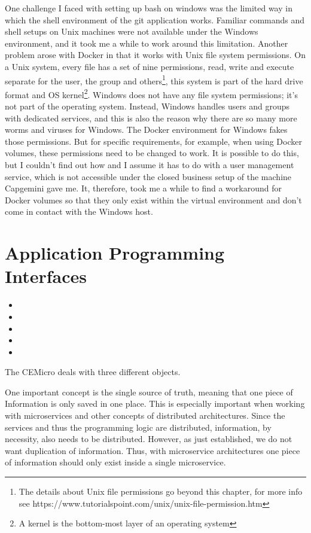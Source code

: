One challenge I faced with setting up bash on windows was the limited way in which the shell environment of the git application works. Familiar commands and shell setups on Unix machines were not available under the Windows environment, and it took me a while to work around this limitation. Another problem arose with Docker in that it works with Unix file system permissions. On a Unix system, every file has a set of nine permissions, read, write and execute separate for the user, the group and others\footnote{The details about Unix file permissions go beyond this chapter, for more info see https://www.tutorialspoint.com/unix/unix-file-permission.htm}, this system is part of the hard drive format and OS kernel\footnote{A kernel is the bottom-most layer of an operating system}. Windows does not have any file system permissions; it's not part of the operating system. Instead, Windows handles users and groups with dedicated services, and this is also the reason why there are so many more worms and viruses for Windows. The Docker environment for Windows fakes those permissions. But for specific requirements, for example, when using Docker volumes, these permissions need to be changed to work. It is possible to do this, but I couldn't find out how and I assume it has to do with a user management service, which is not accessible under the closed business setup of the machine Capgemini gave me. It, therefore, took me a while to find a workaround for Docker volumes so that they only exist within the virtual environment and don't come in contact with the Windows host.

\section{Application Programming Interfaces}
\label{sec:impl:api}

\begin{itemize}
  \item {}
  \item {}
  \item {}
  \item {}
  \item {}
\end{itemize}

The CEMicro deals with three different objects.

One important concept is the single source of truth, meaning that one piece of Information is only saved in one place. This is especially important when working with microservices and other concepts of distributed architectures. Since the services and thus the programming logic are distributed, information, by necessity, also needs to be distributed. However, as just established, we do not want duplication of information. Thus, with microservice architectures one piece of information should only exist inside a single microservice.

